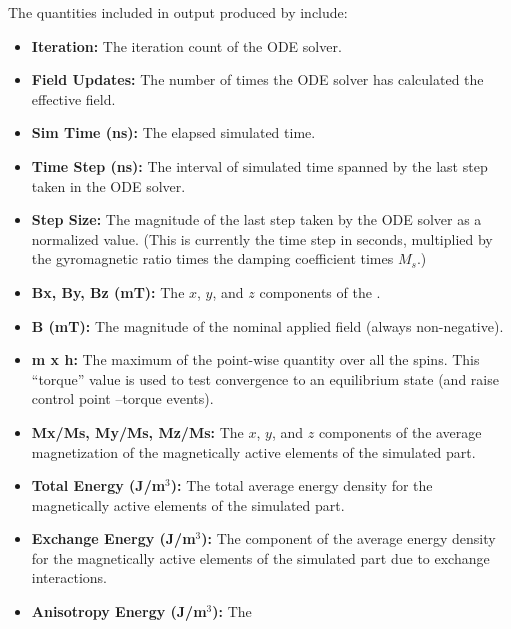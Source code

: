 The quantities included in  output produced by
 include:
\begin{itemize}
\item {\bf Iteration:} The iteration count of the ODE
      solver.
\item {\bf Field Updates:} The number of times the
      ODE solver has calculated the effective field.
\item {\bf Sim Time (ns):} The elapsed simulated
      time.
\item {\bf Time Step (ns):} The interval of simulated
      time spanned by the last step taken in the ODE solver.
\item {\bf Step Size:} The magnitude of the last step
        taken by the ODE solver as a normalized value.  (This is
        currently the time step in seconds, multiplied by the
        gyromagnetic ratio times the damping coefficient times $M_s$.)
\item {\bf Bx, By, Bz (mT):} The $x$, $y$, and $z$
        components of the .
\item {\bf B (mT):} The magnitude of the nominal applied field (always non-negative).
\item {\bf \pipe m x h\pipe:}  The maximum of the
        point-wise quantity
         over all the spins.  This ``torque'' value is
        used to test convergence to an equilibrium state (and raise
        control point --torque events).
\item {\bf Mx/Ms, My/Ms, Mz/Ms:} The $x$,
        $y$, and $z$ components of the average magnetization of the
        magnetically active elements of the simulated part.
\item {\bf Total Energy (J/m${}^3$):} The total
        average energy density for the magnetically active elements of
        the simulated part.
\item {\bf Exchange Energy (J/m${}^3$):} The
        component of the average energy density for the magnetically
        active elements of the simulated part due to exchange
        interactions.
\item {\bf Anisotropy Energy (J/m${}^3$):} The

\end{itemize}
